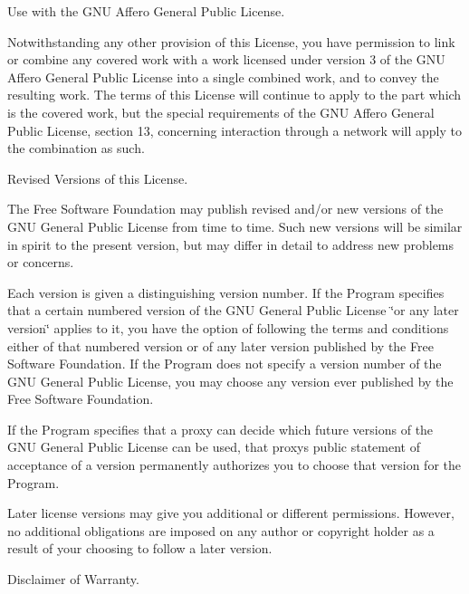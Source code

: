 \begin{DoxyEnumerate}
\item Use with the G\+NU Affero General Public License.
\end{DoxyEnumerate}

Notwithstanding any other provision of this License, you have permission to link or combine any covered work with a work licensed under version 3 of the G\+NU Affero General Public License into a single combined work, and to convey the resulting work. The terms of this License will continue to apply to the part which is the covered work, but the special requirements of the G\+NU Affero General Public License, section 13, concerning interaction through a network will apply to the combination as such.


\begin{DoxyEnumerate}
\item Revised Versions of this License.
\end{DoxyEnumerate}

The Free Software Foundation may publish revised and/or new versions of the G\+NU General Public License from time to time. Such new versions will be similar in spirit to the present version, but may differ in detail to address new problems or concerns.

Each version is given a distinguishing version number. If the Program specifies that a certain numbered version of the G\+NU General Public License \char`\"{}or any later version\char`\"{} applies to it, you have the option of following the terms and conditions either of that numbered version or of any later version published by the Free Software Foundation. If the Program does not specify a version number of the G\+NU General Public License, you may choose any version ever published by the Free Software Foundation.

If the Program specifies that a proxy can decide which future versions of the G\+NU General Public License can be used, that proxy\textquotesingle{}s public statement of acceptance of a version permanently authorizes you to choose that version for the Program.

Later license versions may give you additional or different permissions. However, no additional obligations are imposed on any author or copyright holder as a result of your choosing to follow a later version.


\begin{DoxyEnumerate}
\item Disclaimer of Warranty.
\end{DoxyEnumerate}

